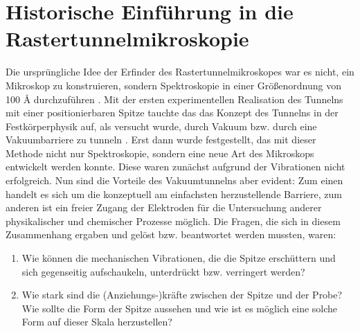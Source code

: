 \section{Historische Einführung in die Rastertunnelmikroskopie}
Die ursprüngliche Idee der Erfinder des Rastertunnelmikroskopes
war es nicht, ein Mikroskop zu konstruieren,
sondern Spektroskopie in einer Größenordnung von 
100 \r{A} durchzuführen \cite{binnig1987scanning}.
Mit der ersten experimentellen Realisation \cite{thompson1976thermal}
des Tunnelns mit einer positionierbaren Spitze tauchte das 
das Konzept des Tunnelns in der 
Festkörperphysik auf, als versucht wurde, durch Vakuum bzw. durch
eine Vakuumbarriere zu tunneln \cite{binnig1982tunneling}. 
Erst dann wurde festgestellt, das mit dieser Methode nicht nur
Spektroskopie, sondern eine neue Art des Mikroskops entwickelt werden
konnte.
Diese
waren zunächst aufgrund der Vibrationen nicht erfolgreich. Nun sind
die Vorteile des Vakuumtunnelns aber evident: 
Zum einen handelt es sich um die konzeptuell am einfachsten
herzustellende Barriere, zum anderen ist ein freier Zugang 
der Elektroden für die Untersuchung anderer
physikalischer und chemischer Prozesse möglich.
Die Fragen, die sich in diesem Zusammenhang
ergaben und gelöst bzw. beantwortet werden mussten, waren:

\begin{enumerate}
\item Wie können die mechanischen Vibrationen, die die Spitze
erschüttern und sich gegenseitig aufschaukeln, unterdrückt bzw.
verringert werden?
\item Wie stark sind die (Anziehungs-)kräfte zwischen der Spitze
und der Probe? Wie sollte die Form der Spitze aussehen und wie
ist es möglich eine solche Form auf dieser Skala herzustellen?

\end{enumerate}

